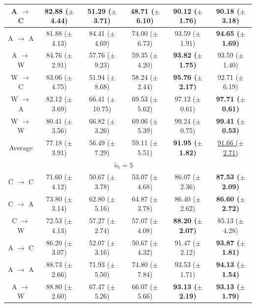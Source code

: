 \begin{table}[t]
\begin{tabular}{c c c c c c}
    A $\to$ C & 82.88 ($\pm$ 4.44) & 51.29 ($\pm$ 3.71) & 48.71 ($\pm$ 6.10) & 90.12 ($\pm$ 1.76) & \textbf{90.18 ($\pm$ 3.18)} \\
    \hline
    A $\to$ A & 81.88 ($\pm$ 4.13) & 84.41 ($\pm$ 4.69) & 74.00 ($\pm$ 6.73) & 93.59 ($\pm$ 1.91) & \textbf{94.65 ($\pm$ 1.69)} \\
    \hline
    A $\to$ W & 84.76 ($\pm$ 2.91) & 57.76 ($\pm$ 9.23) & 59.35 ($\pm$ 4.20) & \textbf{93.82 ($\pm$ 1.75)} & 93.59 ($\pm$ 1.40) \\
    \hline

    W $\to$ C & 83.06 ($\pm$ 4.75) & 51.94 ($\pm$ 8.68) & 58.24 ($\pm$ 2.44) & \textbf{95.76 ($\pm$ 2.17)} & 92.71 ($\pm$ 6.19) \\
    \hline
    W $\to$ A & 82.12 ($\pm$ 3.69) & 66.41 ($\pm$ 10.75) & 69.53 ($\pm$ 5.62) & 97.12 ($\pm$ 0.61) & \textbf{97.71 ($\pm$ 0.61)} \\
    \hline
    W $\to$ W & 80.41 ($\pm$ 3.56) & 66.82 ($\pm$ 3.26) & 69.06 ($\pm$ 5.39) & 99.24 ($\pm$ 0.75) & \textbf{99.41 ($\pm$ 0.53)} \\
    \midrule
    Average & 77.18 ($\pm$ 3.91) & 56.49 ($\pm$ 7.29) & 59.11 ($\pm$ 5.51) & \textbf{91.95 ($\pm$ 1.82)} & \underline{91.66 ($\pm$ 2.71)} \\

    \midrule
    & \multicolumn{4}{c}{\large{$\tilde{n}_t = 5$}} \\
    \midrule

    C $\to$ C & 71.60 ($\pm$ 4.12) & 50.67 ($\pm$ 3.78) & 53.07 ($\pm$ 4.68) & 86.07 ($\pm$ 2.36) & \textbf{87.53 ($\pm$ 2.09)} \\
    \hline
    C $\to$ A & 73.80 ($\pm$ 3.14) & 62.80 ($\pm$ 5.16) & 64.87 ($\pm$ 3.78) & 86.40 ($\pm$ 2.62) & \textbf{86.60 ($\pm$ 2.72)} \\
    \hline
    C $\to$ W & 72.53 ($\pm$ 4.13) & 57.27 ($\pm$ 2.74) & 57.07 ($\pm$ 4.08) & \textbf{88.20 ($\pm$ 2.07)} & 85.13 ($\pm$ 4.28) \\
    \hline

    A $\to$ C & 86.20 ($\pm$ 3.07) & 52.07 ($\pm$ 3.16) & 50.67 ($\pm$ 4.32) & 91.47 ($\pm$ 2.12) & \textbf{93.87 ($\pm$ 1.81)} \\
    \hline
    A $\to$ A & 88.73 ($\pm$ 2.66) & 71.93 ($\pm$ 5.50) & 74.80 ($\pm$ 7.84) & 93.53 ($\pm$ 1.71) & \textbf{94.13 ($\pm$ 1.54)} \\
    \hline
    A $\to$ W & 88.80 ($\pm$ 2.60) & 67.47 ($\pm$ 5.26) & 66.07 ($\pm$ 5.66) & \textbf{93.13 ($\pm$ 2.19)} & \textbf{93.13 ($\pm$ 1.79)} \\
    \hline


\end{tabular}
\end{table}
